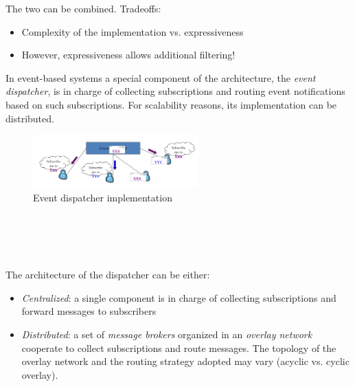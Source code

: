 \documentclass[10pt,a4paper]{article}
\begin{document}
The two can be combined.
Tradeoffs:
\begin{itemize}
	\item Complexity of the implementation vs. expressiveness
	\item However, expressiveness allows additional filtering!
\end{itemize}
In event-based systems a special component of the architecture, the \textit{event dispatcher}, is in charge of collecting subscriptions and routing event notifications based on such subscriptions. For scalability reasons, its implementation can be distributed.
 \begin{figure}[h!]
 \hfill \includegraphics[width=180pt]{images/event-dispatcher.png}\hspace*{\fill}
 \caption{Event dispatcher implementation}
  \label{fig:event-dispatcher}
\end{figure} \\ \\ \\ \\
The architecture of the dispatcher can be either:
\begin{itemize}
	\item \textit{Centralized}: a single component is in charge of collecting subscriptions and forward messages to subscribers
	\item \textit{Distributed}: a set of \textit{message brokers} organized in an \textit{overlay network} cooperate to collect subscriptions and route messages. The topology of the overlay network and the routing strategy adopted may vary (acyclic vs. cyclic overlay).
\end{itemize}
\end{document}
